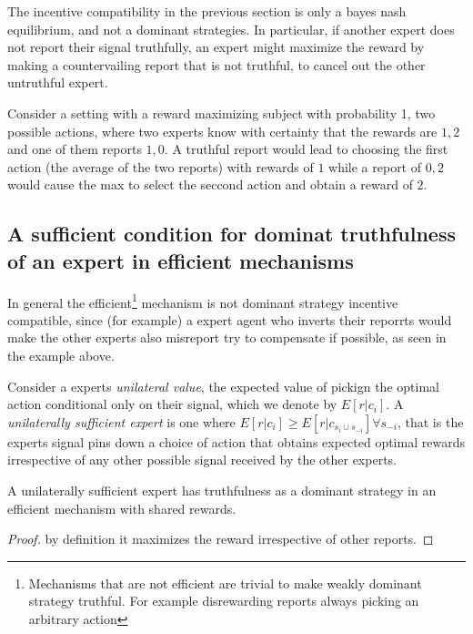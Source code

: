 The incentive compatibility in the previous section is only a bayes nash equilibrium, and not a dominant strategies. In particular, if another expert does not report their signal truthfully, an expert might maximize the reward by making a countervailing report that is not truthful, to cancel out the other untruthful expert. 

\begin{eg}
	Consider a setting with a reward maximizing subject with probability 1, two possible actions, where two experts know with certainty that the rewards are $1,2$ and one of them reports $1,0$. A truthful report would lead to choosing the first action (the average of the two reports) with rewards of $1$ while a report of $0,2$ would cause the max to select the seccond action and obtain a reward of $2$.
\end{eg}


\subsection{A sufficient condition for dominat truthfulness of an expert in efficient mechanisms}

In general the efficient\footnote{Mechanisms that are not efficient are trivial to make weakly dominant strategy truthful. For example disrewarding reports always picking an arbitrary action} mechanism is not dominant strategy incentive compatible, since (for example) a expert agent who inverts their reporrts would make the other experts also misreport try to compensate if possible, as seen in the example above.

Consider a experts \emph{unilateral value}, the expected value of pickign the optimal action conditional only on their signal, which we denote by  $E[ r| c_{i}]$. A \emph{unilaterally sufficient expert} is one where $E[r|c_{i}] \geq E[r|c_{s_i \cup s_{-i}}] \forall s_{-i}$, that is the experts signal pins down a choice of action that obtains expected optimal rewards irrespective of any other possible signal received by the other experts.

\begin{lem}
	A unilaterally sufficient expert has truthfulness as a dominant strategy in an efficient mechanism with shared rewards.
\end{lem}

\begin{proof}
    by definition it maximizes the reward irrespective of other reports.
\end{proof}

